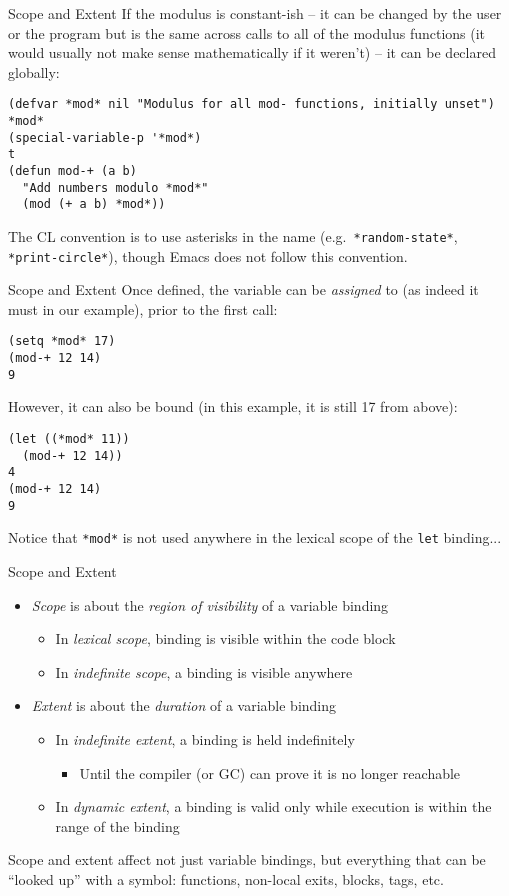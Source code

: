 \documentclass[presentation]{beamer}
\begin{document}
\begin{frame}[fragile]{Scope and Extent}
  If the modulus is constant-ish -- it can be changed by the user or the program but is the same across calls to all of the modulus functions (it would usually not make sense mathematically if it weren't) -- it can be declared globally:
\begin{verbatim}
(defvar *mod* nil "Modulus for all mod- functions, initially unset")
*mod*
(special-variable-p '*mod*)
t
(defun mod-+ (a b)
  "Add numbers modulo *mod*"
  (mod (+ a b) *mod*))
\end{verbatim}
The CL convention is to use asterisks in the name (e.g.\ \texttt{*random-state*}, \texttt{*print-circle*}), though Emacs does not follow this convention.
\end{frame}

\begin{frame}[fragile]{Scope and Extent}
  Once defined, the variable can be \emph{assigned} to (as indeed it must in our example), prior to the first call:
\begin{verbatim}
(setq *mod* 17)
(mod-+ 12 14)
9
\end{verbatim}

However, it can also be bound (in this example, it is still 17 from above):
\begin{verbatim}
(let ((*mod* 11))
  (mod-+ 12 14))
4
(mod-+ 12 14)
9  
\end{verbatim}
Notice that \texttt{*mod*} is not used anywhere in the lexical scope of the \texttt{let} binding...
\end{frame}

\begin{frame}{Scope and Extent}
  \begin{itemize}
  \item \emph{Scope} is about the \emph{region of visibility} of a variable binding
    \begin{itemize}
    \item In \emph{lexical scope}, binding is visible within the code block
    \item In \emph{indefinite scope}, a binding is visible anywhere
    \end{itemize}
  \item \emph{Extent} is about the \emph{duration} of a variable binding
    \begin{itemize}
    \item In \emph{indefinite extent}, a binding is held indefinitely
      \begin{itemize}
      \item Until the compiler (or GC) can prove it is no longer reachable
      \end{itemize}
    \item In \emph{dynamic extent}, a binding is valid only while execution is within the range of the binding
    \end{itemize}
  \end{itemize}

  \medskip
  Scope and extent affect not just variable bindings, but everything that can be ``looked up'' with a symbol: functions, non-local exits, blocks, tags, etc.
\end{frame}
\end{document}
